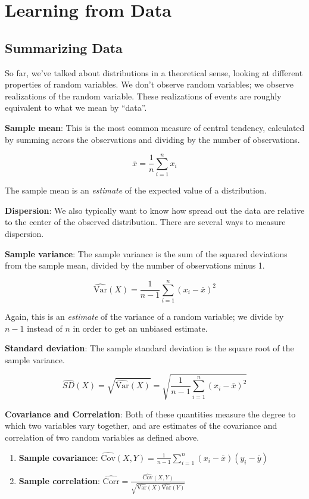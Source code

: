 \documentclass[
  letterpaper,
]{book}
\providecommand{\tightlist}{%
  \setlength{\itemsep}{0pt}\setlength{\parskip}{0pt}}\usepackage{longtable,booktabs,array}
\theoremstyle{definition}
\theoremstyle{definition}
\theoremstyle{plain}
\theoremstyle{definition}
\theoremstyle{plain}
\theoremstyle{plain}
\theoremstyle{remark}
\begin{document}
\hypertarget{statistics}{%
\chapter{Learning from Data}\label{statistics}}

\hypertarget{summarizing-data}{%
\section{Summarizing Data}\label{summarizing-data}}

So far, we've talked about distributions in a theoretical sense, looking
at different properties of random variables. We don't observe random
variables; we observe realizations of the random variable. These
realizations of events are roughly equivalent to what we mean by
``data''.

\textbf{Sample mean}: This is the most common measure of central
tendency, calculated by summing across the observations and dividing by
the number of observations.

\[\bar{x} = \frac{1}{n}\sum_{i=1}^{n}x_i\]

The sample mean is an \emph{estimate} of the expected value of a
distribution.

\textbf{Dispersion}: We also typically want to know how spread out the
data are relative to the center of the observed distribution. There are
several ways to measure dispersion.

\textbf{Sample variance}: The sample variance is the sum of the squared
deviations from the sample mean, divided by the number of observations
minus 1.

\[ \hat{\text{Var}}(X) = \frac{1}{n-1}\sum_{i = 1}^n (x_i - \bar{x})^2\]

Again, this is an \emph{estimate} of the variance of a random variable;
we divide by \(n - 1\) instead of \(n\) in order to get an unbiased
estimate.

\textbf{Standard deviation}: The sample standard deviation is the square
root of the sample variance.

\[ \hat{SD}(X) = \sqrt{\hat{\text{Var}}(X)} = \sqrt{\frac{1}{n-1}\sum_{i = 1}^n (x_i - \bar{x})^2}\]

\textbf{Covariance and Correlation}: Both of these quantities measure
the degree to which two variables vary together, and are estimates of
the covariance and correlation of two random variables as defined above.

\begin{enumerate}
\def\labelenumi{\arabic{enumi}.}
\tightlist
\item
  \textbf{Sample covariance}:
  \(\hat{\text{Cov}}(X,Y) = \frac{1}{n-1}\sum_{i = 1}^n(x_i - \bar{x})(y_i - \bar{y})\)
\item
  \textbf{Sample correlation}:
  \(\hat{\text{Corr}} = \frac{\hat{\text{Cov}}(X,Y)}{\sqrt{\hat{\text{Var}}(X)\hat{\text{Var}}(Y)}}\)
\end{enumerate}
\end{document}
